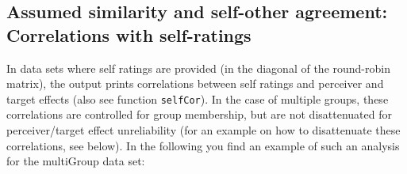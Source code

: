\documentclass[a4paper]{article}\usepackage[]{graphicx}\usepackage[]{color}
\begin{document}
\subsection{Assumed similarity and self-other agreement: Correlations with self-ratings} %

In data sets where self ratings are provided (in the diagonal of the round-robin matrix), the output prints correlations between self ratings and perceiver and target effects (also see function \texttt{selfCor}). In the case of multiple groups, these correlations are controlled for group membership, but are not disattenuated for perceiver/target effect unreliability (for an example on how to disattenuate these correlations, see below). In the following you find an example of such an analysis for the multiGroup data set:
\end{document}
